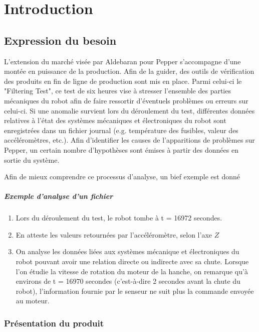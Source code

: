 \chapter{Introduction}
\label{Introduction}
\thispagestyle{fancy}

\section{Expression du besoin}
\label{Introduction:Expression du besoin}
L'extension du marché visée par Aldebaran pour Pepper s'accompagne d'une montée en puissance de la production. Afin de la guider, des outils de vérification des produits en fin de ligne de production sont mis en place. Parmi celui-ci le "Filtering Test", ce test de six heures vise à stresser l'ensemble des parties mécaniques du robot afin de faire ressortir d'éventuels problèmes ou erreurs sur celui-ci. Si une anomalie survient lors du déroulement du test, différentes données relatives à l'état des systèmes mécaniques et électroniques du robot sont enregistrées dans un fichier journal (e.g. température des fusibles, valeur des accéléromètres, etc.). Afin d'identifier les causes de l'apparitions de problèmes sur Pepper, un certain nombre d'hypothèses sont émises à partir des données en sortie du système. 

Afin de mieux comprendre ce processus d'analyse, un bief exemple est donné 

\paragraph{Exemple d'analyse d'un fichier}
\label{Introduction:Expression du besoin:Exemple d'analyse d'un fichier}
\begin{enumerate}
	\item Lors du déroulement du test, le robot tombe à t = 16972 secondes.
	\item En atteste les valeurs retournées par l'accéléromètre, selon l'axe $Z$
	\item On analyse les données liées aux systèmes mécanique et électroniques du robot pouvant avoir une relation directe ou indirecte avec sa chute.  
	Lorsque l'on étudie la vitesse de rotation du moteur de la hanche, on remarque qu'à environs de  t = 16970 secondes (c'est-à-dire 2 secondes avant la chute du robot),  l'information fournie par le senseur ne suit plus la commande  envoyée au moteur.
\end{enumerate}

\subsection{Présentation du produit}
\label{Introduction:Expression du besoin:Présentation du produit}

